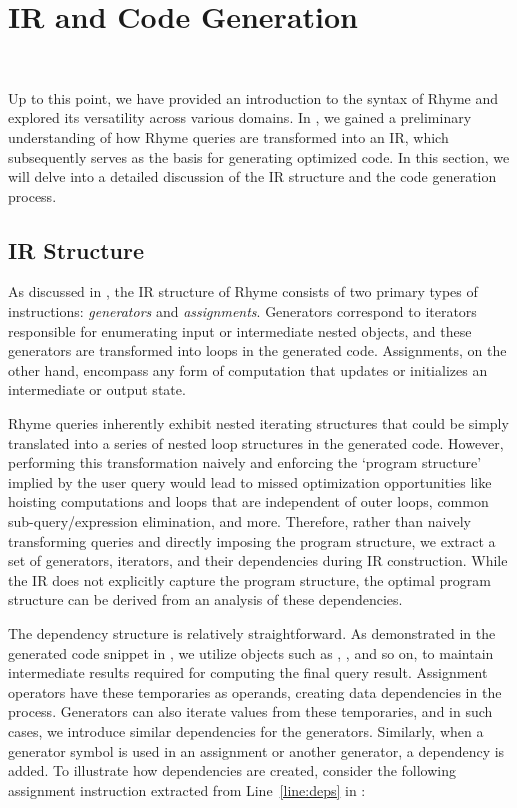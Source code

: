 \documentclass[runningheads]{llncs}
\newcommand{\lang}{Rhyme}
\begin{document}
\section{IR and Code Generation}~\label{sec:ir_codegen}

Up to this point, we have provided an introduction to the syntax of
\lang{} and explored its versatility across various domains.
In , we gained a preliminary understanding
of how \lang{} queries are transformed into an IR, which subsequently serves
as the basis for generating optimized code.
In this section, we will delve into a detailed discussion of the IR structure
and the code generation process.


\subsection{IR Structure}\label{subsec:ir}

As discussed in , the IR structure of \lang{} consists of two
primary types of instructions: \emph{generators} and \emph{assignments}.
Generators correspond to iterators responsible for enumerating input or intermediate
nested objects, and these generators are transformed into loops in the generated code.
Assignments, on the other hand, encompass any form of computation that updates or
initializes an intermediate or output state.

\lang{} queries inherently exhibit nested iterating structures that could be simply
translated into a series of nested loop structures in the generated code.
However, performing this transformation naively and enforcing the `program structure'
implied by the user query would lead to missed optimization opportunities like
hoisting computations and loops that are independent of outer loops,
common sub-query/expression elimination, and more.
Therefore, rather than naively transforming queries and directly imposing the program
structure, we extract a set of generators, iterators, and their dependencies during
IR construction.
While the IR does not explicitly capture the program structure, the optimal program
structure can be derived from an analysis of these dependencies.

The dependency structure is relatively straightforward.
As demonstrated in the generated code snippet in , we utilize objects such
as , , and so on, to maintain intermediate results required
for computing the final query result.
Assignment operators have these temporaries as operands, creating data dependencies in the
process.
Generators can also iterate values from these temporaries, and in such cases, we introduce
similar dependencies for the generators.
Similarly, when a generator symbol is used in an assignment or another generator, a
dependency is added.
To illustrate how dependencies are created, consider the following assignment instruction
extracted from Line~\ref{line:deps} in :
\end{document}
